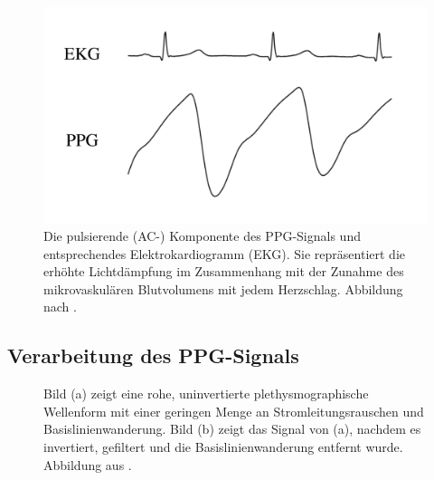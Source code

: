 \documentclass[10pt,a4paper,headinclude,twoside, plainheadsepline, open=right, numbers=noenddot, twocolumn]{article}
\begin{document}
\begin{figure}
	\centering
	\includegraphics[width=\linewidth]{images/ekgundppg.pdf}
	\caption{Die pulsierende (AC-) Komponente des PPG-Signals und entsprechendes Elektrokardiogramm
(EKG). Sie repräsentiert die erhöhte Lichtdämpfung im Zusammenhang mit der Zunahme des mikrovaskulären Blutvolumens mit jedem Herzschlag. Abbildung nach \cite{john2007photopletysmography}.}
	\label{ekg}
\end{figure}

\subsection{Verarbeitung des PPG-Signals}
\label{verarbeitung des ppg-signals}

\begin{figure}[ht]
	\centering
  \qquad
	\caption{Bild (a) zeigt eine rohe, uninvertierte plethysmographische Wellenform mit einer geringen Menge an Stromleitungsrauschen und Basislinienwanderung. Bild (b) zeigt das Signal von (a), nachdem es invertiert, gefiltert und die Basislinienwanderung entfernt wurde. Abbildung aus \cite{mcpherson2015systems}.}
	\label{verarbeitung}
\end{figure}
\end{document}
